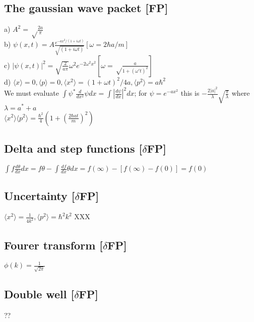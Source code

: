 \documentclass{article}
\newcommand{\<}{\langle}
\renewcommand{\>}{\rangle}
\begin{document}
\subsection{The gaussian wave packet [FP]}

a) $A^2 = \sqrt\frac{2a}{\pi}$ \\
b) $\psi(x,t) = A\frac{e^{-ax^2/(1+i\omega t)}} {\sqrt{(1+i\omega t)}} [\omega = 2\hbar a / m] $ \\
c) $|\psi(x,t)|^2 = \sqrt{\frac{2}{a\pi}} \omega^2 e^{-2\omega^2x^2} [\omega = \sqrt\frac{a}{1+(\omega' t)^2}]$ \\
d) $\<x\> = 0, \<p\> = 0, \<x^2\> = (1+\omega t)^2 / 4a, \<p^2\> = a \hbar^2$
\\
We must evaluate $\int \psi^* \frac{d}{dx^2} \psi dx = \int |\frac{d\psi}{dx}|^2 dx$; for $\psi = e^{-ax^2}$ this is $-\frac{2|a|^2}{\lambda} \sqrt{\frac{\pi}{\lambda}}$ where $\lambda = a^* + a$
\\
$\<x^2\>\<p^2\> = \frac{\hbar^2}{4} (1 + (\frac{2\hbar a t}{m})^2)$

\subsection{}

\subsection{Delta and step functions [$\delta$FP]}

$\int f \frac{d\theta}{dx} dx = f\theta - \int \frac{df}{dx} \theta dx = f(\infty) - [f(\infty) - f(0)] = f(0) $

\subsection{Uncertainty [$\delta$FP]}

$\<x^2\> = \frac{1}{4k^2}, \<p^2\> = \hbar^2k^2$ XXX

\subsection{Fourer transform [$\delta$FP]}

$\phi(k) = \frac{1}{\sqrt{2\pi}}$

\subsection{Double well [$\delta$FP]}

??
\end{document}
